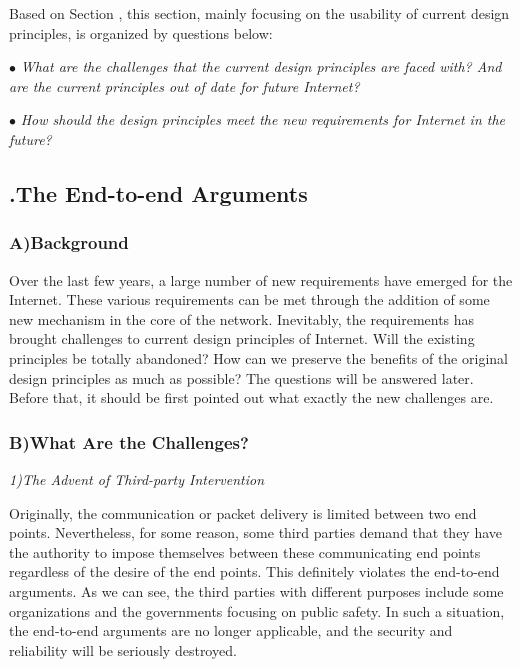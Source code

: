 \documentclass[11pt,twocolumn]{article}
\begin{document}
Based on Section \uppercase\expandafter{}, this section, mainly focusing on the usability of current design principles, is organized by questions below\cite{DIS}:

$\bullet$ \emph{What are the challenges that the current design principles are faced with? And are the current principles out of date for future Internet?}

$\bullet$ \emph{How should the design principles meet the new requirements for Internet in the future?}


\subsection*{{}.\quad The End-to-end Arguments}
\subsubsection*{A)\quad Background}

Over the last few years, a large number of new requirements have emerged for the Internet. These various requirements can be met through the addition of some new mechanism in the core of the network. Inevitably, the requirements has brought challenges to current design principles of Internet\cite{Tussle}. Will the existing principles be totally abandoned? How can we preserve the benefits of the original design principles as much as possible? The questions will be answered later. Before that, it should be first pointed out what exactly the new challenges are.

\subsubsection*{B)\quad What Are the Challenges?}

\emph{1)\quad The Advent of Third-party Intervention}

Originally, the communication or packet delivery is limited between two end points. Nevertheless, for some reason, some third parties demand that they have the authority to impose themselves between these communicating end points regardless of the desire of the end points\cite{ClarkR}. This definitely violates the end-to-end arguments. As we can see, the third parties with different purposes include some organizations and the governments focusing on public safety. In such a situation, the end-to-end arguments are no longer applicable, and the security and reliability will be seriously destroyed.
\end{document}
